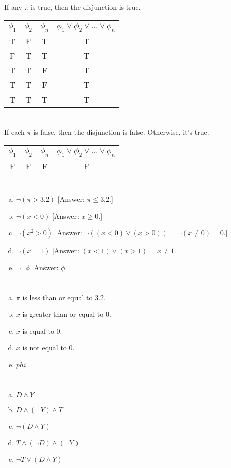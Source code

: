 \documentclass{article}
\begin{document}
If any $\pi$ is true, then the disjunction is true.

\begin{tabular}{ | c | c | c | c | }
  \hline
  $\phi_1$ & $\phi_2$ & $\phi_n$ & $\phi_1 \vee \phi_2 \vee \dots \vee \phi_n$ \\
  \hline
  T & F & T & T \\
  F & T & T & T \\
  T & T & F & T \\
  T & T & F & T \\
  T & T & T & T \\
  \hline
\end{tabular}

\section{}

If each $\pi$ is false, then the disjunction is false. Otherwise, it's true.

\begin{tabular}{ | c | c | c | c | }
  \hline
  $\phi_1$ & $\phi_2$ & $\phi_n$ & $\phi_1 \vee \phi_2 \vee \dots \vee \phi_n$ \\
  \hline
  F & F & F & F \\
  \hline
\end{tabular}


\section{}

\begin{enumerate}[(a)]
\item $\neg(\pi > 3.2)$ [Answer: $\pi \leq 3.2$.]
\item $\neg(x < 0)$ [Answer: $x \geq 0$.]
\item $\neg(x^2 > 0)$ [Answer: $\neg((x < 0) \vee (x > 0)) = \neg(x \neq 0) = 0$.]
\item $\neg(x = 1)$ [Answer: $(x < 1) \vee (x > 1) = x \neq 1$.]
\item $\neg\neg\phi$ [Answer: $\phi$.]
\end{enumerate}

\section{}

\begin{enumerate}[(a)]
\item $\pi$ is less than or equal to 3.2.
\item $x$ is greater than or equal to 0.
\item $x$ is equal to 0.
\item $x$ is not equal to 0.
\item $phi$.
\end{enumerate}

\section{}

\begin{enumerate}[(a)]
\item $D \wedge Y$
\item $D \wedge (\neg Y) \wedge T$
\item $\neg(D \wedge Y)$
\item $T \wedge (\neg D) \wedge (\neg Y)$
\item $\neg T \vee (D \wedge Y)$
\end{enumerate}
\end{document}
